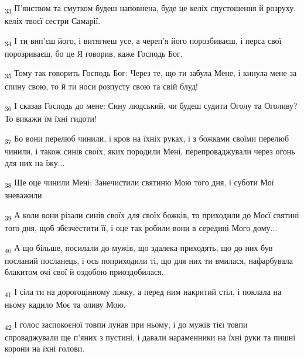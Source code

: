 \begin{tcolorbox}
\textsubscript{33} П'янством та смутком будеш наповнена, буде це келіх спустошення й розруху, келіх твоєї сестри Самарії.
\end{tcolorbox}
\begin{tcolorbox}
\textsubscript{34} І ти вип'єш його, і витягнеш усе, а череп'я його порозбиваєш, і перса свої порозриваєш, бо це Я говорив, каже Господь Бог.
\end{tcolorbox}
\begin{tcolorbox}
\textsubscript{35} Тому так говорить Господь Бог: Через те, що ти забула Мене, і кинула мене за спину свою, то й ти носи розпусту свою та свій блуд!
\end{tcolorbox}
\begin{tcolorbox}
\textsubscript{36} І сказав Господь до мене: Сину людський, чи будеш судити Оголу та Оголиву? То викажи їм їхні гидоти!
\end{tcolorbox}
\begin{tcolorbox}
\textsubscript{37} Бо вони перелюб чинили, і кров на їхніх руках, і з божками своїми перелюб чинили, і також синів своїх, яких породили Мені, перепроваджували через огонь для них на їжу...
\end{tcolorbox}
\begin{tcolorbox}
\textsubscript{38} Ще оце чинили Мені: Занечистили святиню Мою того дня, і суботи Мої зневажили.
\end{tcolorbox}
\begin{tcolorbox}
\textsubscript{39} А коли вони різали синів своїх для своїх божків, то приходили до Моєї святині того дня, щоб збезчестити її, і оце так робили вони в середині Мого дому...
\end{tcolorbox}
\begin{tcolorbox}
\textsubscript{40} А що більше, посилали до мужів, що здалека приходять, що до них був посланий посланець, і ось поприходили ті, що для них ти вмилася, нафарбувала блакитом очі свої й оздобою приоздобилася.
\end{tcolorbox}
\begin{tcolorbox}
\textsubscript{41} І сіла ти на дорогоцінному ліжку, а перед ним накритий стіл, і поклала на ньому кадило Моє та оливу Мою.
\end{tcolorbox}
\begin{tcolorbox}
\textsubscript{42} І голос заспокоєної товпи лунав при ньому, і до мужів тієї товпи спроваджували ще п'яних з пустині, і давали нараменники на їхні руки та пишні корони на їхні голови.
\end{tcolorbox}
